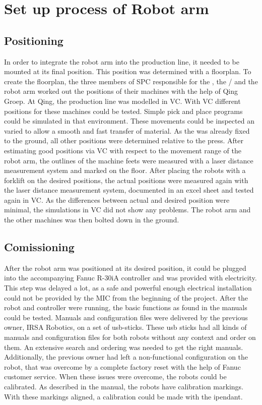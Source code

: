\section{Set up process of Robot arm}

\subsection{Positioning}
In order to integrate the robot arm into the production line, it needed to be mounted at its final position. This position was determined with a floorplan. To create the floorplan, the three members of SPC responsible for the , the / and the robot arm worked out the positions of their machines with the help of Qing Groep. At Qing, the production line was modelled in \ac{VC}. With \ac{VC} different positions for these machines could be tested. 
Simple pick and place programs could be simulated in that environment.
These movements could be inspected an varied to allow a smooth and fast transfer of material.
As the  was already fixed to the ground, all other positions were determined relative to the press.
After estimating good positions via \ac{VC} with respect to the movement range of the robot arm, the outlines of the machine feets were measured with a laser distance measurement system and marked on the floor.
After placing the robots with a forklift on the desired positions, the actual positions were measured again with the laser distance measurement system, documented in an excel sheet and tested again in VC. 
As the differences between actual and desired position were minimal, the simulations in VC did not show any problems.
The robot arm and the other machines was then bolted down in the ground. 

\subsection{Comissioning}
After the robot arm was positioned at its desired position, it could be plugged into the accompanying Fanuc R-30iA controller and was provided with electricity. 
This step was delayed a lot, as a safe and powerful enough electrical installation could not be provided by the \ac{MIC} from the beginning of the project.
After the robot and controller were running, the basic functions as found in the manuals could be tested. 
Manuals and configuration files were delivered by the previous owner, IRSA Robotics, on a set of \ac{usb}-sticks. 
These \ac{usb} sticks had all kinds of manuals and configuration files for both robots without any context and order on them. 
An extensive search and ordering was needed to get the right manuals.
Additionally, the previous owner had left a non-functional configuration on the robot, that was overcome by a complete factory reset with the help of Fanuc customer service.
When these issues were overcome, the robots could be calibrated. As described in the manual, the robots have calibration markings. With these markings aligned, a calibration could be made with the \gls{ipendant}.




